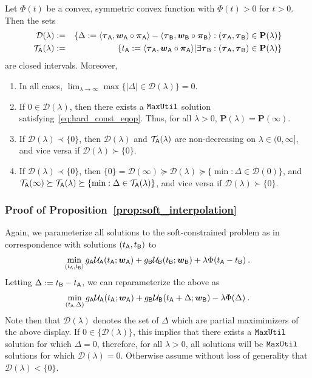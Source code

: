 	\begin{prop}\label{prop:soft_interpolation} Let $\Phi(t)$ be a convex, symmetric convex function with $\Phi(t) > 0$ for $t > 0$. Then the sets
	\begin{eqnarray*}
	\mathcal{D}(\lambda) &:=& \{\Delta := \langle \boldsymbol{\tau}_{\mathsf{A}},\boldsymbol{w}_{\mathsf{A}} \circ \boldsymbol{\pi}_{\mathsf{A}} \rangle - \langle \boldsymbol{\tau}_{\mathsf{B}},\boldsymbol{w}_{\mathsf{B}} \circ \boldsymbol{\pi}_{\mathsf{B}} \rangle  :(\boldsymbol{\tau}_{\mathsf{A}},\boldsymbol{\tau}_{\mathsf{B}}) \in \mathbf{P}(\lambda)\}\\
	 \mathcal{T}_{\mathsf{A}}(\lambda) &:=& \{t_{\mathsf{A}} := \langle \boldsymbol{\tau}_{\mathsf{A}},\boldsymbol{w}_{\mathsf{A}} \circ \boldsymbol{\pi}_{\mathsf{A}} \rangle | \exists \boldsymbol{\tau}_{\mathsf{B}}: (\boldsymbol{\tau}_{\mathsf{A}},\boldsymbol{\tau}_{\mathsf{B}}) \in \mathbf{P}(\lambda) \}
	\end{eqnarray*}
	are closed intervals. Moreover, 
	\begin{enumerate}
	\item In all cases, $\lim_{\lambda \to \infty} \max \{|\Delta| \in \mathcal{D}(\lambda)\} = 0$.
	\item If $0 \in \mathcal{D}(\lambda) $, then there exists a $\mathtt{MaxUtil}$ solution satisfying~\eqref{eq:hard_const_eqop}. Thus, for all $\lambda > 0$, $\mathbf{P}(\lambda) = \mathbf{P}(\infty)$.
	\item If $\mathcal{D}(\lambda) \prec \{0\}$, then $\mathcal{D}(\lambda)$ and $\mathcal{T}_{\mathsf{A}}(\lambda)$ are non-decreasing on $\lambda \in (0,\infty]$, and vice versa if $\mathcal{D}(\lambda) \succ \{0\}$. 
	\item If $\mathcal{D}(\lambda) \prec \{0\}$, then $\{0\} = \mathcal{D}(\infty) \succeq \mathcal{D}(\lambda) \succeq \{\min:\Delta \in \mathcal{D}(0)\}$, and $\mathcal{T}_{\mathsf{A}}(\infty) \succeq \mathcal{T}_{\mathsf{A}}(\lambda) \succeq \{\min:\Delta \in \mathcal{T}_{\mathsf{A}}(\lambda)\}$, and vice versa if $\mathcal{D}(\lambda) \succ \{0\}$.
\end{enumerate}
	\end{prop}
	

\subsubsection{Proof of Proposition~\ref{prop:soft_interpolation}}

	Again, we parameterize all solutions to the soft-constrained problem as in correspondence with solutions $(t_{\mathsf{A}},t_{\mathsf{B}})$ to 
	\begin{eqnarray*}
	\min_{(t_{\mathsf{A}},t_{\mathsf{B}})} g_{\mathsf{A}} \mathcal{U}_{\mathsf{A}}(t_{\mathsf{A}};\boldsymbol{w}_{\mathsf{A}}) + g_{\mathsf{B}} \mathcal{U}_{\mathsf{B}}(t_{\mathsf{B}};\boldsymbol{w}_{\mathsf{B}}) + \lambda \Phi(t_{\mathsf{A}} - t_{\mathsf{B}})\:.
	\end{eqnarray*}
	Letting $\Delta := t_{\mathsf{B}} - t_{\mathsf{A}}$, we can reparameterize the above as 
	\begin{eqnarray*}
	\min_{(t_{\mathsf{A}},\Delta)} g_{\mathsf{A}} \mathcal{U}_{\mathsf{A}}(t_{\mathsf{A}};\boldsymbol{w}_{\mathsf{A}}) + g_{\mathsf{B}} \mathcal{U}_{\mathsf{B}}(t_{\mathsf{A}} + \Delta;\boldsymbol{w}_{\mathsf{B}}) - \lambda \Phi(\Delta)\:.
	\end{eqnarray*}
	Note then that $\mathcal{D}(\lambda)$ denotes the set of $\Delta$ which are partial maximimizers of the above display. If $0 \in \{\mathcal{D}(\lambda)\}$, this implies that there exists a $\mathtt{MaxUtil}$ solution for which $\Delta = 0$, therefore, for all $\lambda > 0$, all solutions will be $\mathtt{MaxUtil}$ solutions for which $\mathcal{D}(\lambda) = 0$. Otherwise assume without loss of generality that $\mathcal{D}(\lambda) < \{0\}$.


